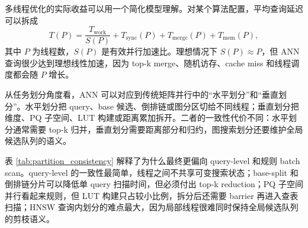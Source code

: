 \documentclass[11pt,a4paper]{article}
\begin{document}
多线程优化的实际收益可以用一个简化模型理解。对某个算法配置，平均查询延迟可以拆成
\[
T(P)=\frac{T_{\mathrm{work}}}{S(P)}+T_{\mathrm{sync}}(P)+T_{\mathrm{merge}}(P)+T_{\mathrm{mem}}(P),
\]
其中 $P$ 为线程数，$S(P)$ 是有效并行加速比。理想情况下 $S(P)\approx P$，但 ANN 查询很少达到理想线性加速，因为 top-k merge、随机访存、cache miss 和线程调度都会随 $P$ 增长。

从任务划分角度看，ANN 可以对应到传统矩阵并行中的“水平划分”和“垂直划分”。水平划分把 query、base 候选、倒排链或图分区切给不同线程；垂直划分把维度、PQ 子空间、LUT 构建或距离累加拆开。二者的一致性代价不同：水平划分通常需要 top-k 归并，垂直划分需要距离部分和归约，图搜索划分还要维护全局候选队列的语义。

\begin{table}[H]\centering\scriptsize
\caption{ANN 中不同任务划分的复杂性与一致性}
\label{tab:partition_consistency}
\end{table}

表 \ref{tab:partition_consistency} 解释了为什么最终更偏向 query-level 和规则 batch scan。query-level 的一致性最简单，线程之间不共享可变搜索状态；base-split 和倒排链分片可以降低单 query 扫描时间，但必须付出 top-k reduction；PQ 子空间并行看起来规则，但 LUT 构建只占较小比例，拆分后还需要 barrier 再进入查表扫描；HNSW 查询内划分的难点最大，因为局部线程很难同时保持全局候选队列的剪枝语义。
\end{document}
